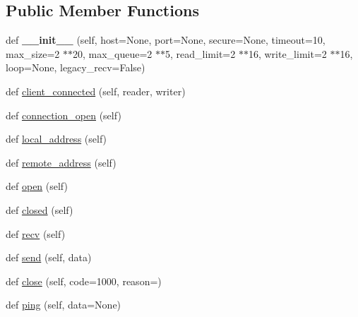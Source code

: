 \subsection*{Public Member Functions}
\begin{DoxyCompactItemize}
\item 
\mbox{\label{classwebsockets_1_1protocol_1_1_web_socket_common_protocol_a3974c237e95cb781821851d300c72ada}} 
def {\bfseries \+\_\+\+\_\+init\+\_\+\+\_\+} (self, host=None, port=None, secure=None, timeout=10, max\+\_\+size=2 $\ast$$\ast$20, max\+\_\+queue=2 $\ast$$\ast$5, read\+\_\+limit=2 $\ast$$\ast$16, write\+\_\+limit=2 $\ast$$\ast$16, loop=None, legacy\+\_\+recv=False)
\item 
def \hyperlink{classwebsockets_1_1protocol_1_1_web_socket_common_protocol_aefe4c82f5ec19977f55679023ac608fb}{client\+\_\+connected} (self, reader, writer)
\item 
def \hyperlink{classwebsockets_1_1protocol_1_1_web_socket_common_protocol_aae85117dc05aa48fa6de503bab27fef5}{connection\+\_\+open} (self)
\item 
def \hyperlink{classwebsockets_1_1protocol_1_1_web_socket_common_protocol_a147f81a594cc1d7f952a90800283ff2d}{local\+\_\+address} (self)
\item 
def \hyperlink{classwebsockets_1_1protocol_1_1_web_socket_common_protocol_a9eb8d78c5c3d633d9636ffd773de87ae}{remote\+\_\+address} (self)
\item 
def \hyperlink{classwebsockets_1_1protocol_1_1_web_socket_common_protocol_ac646626706d4fea1e2ac92c056d1b572}{open} (self)
\item 
def \hyperlink{classwebsockets_1_1protocol_1_1_web_socket_common_protocol_a52bc1f93413a8480ae83af00848d89f6}{closed} (self)
\item 
def \hyperlink{classwebsockets_1_1protocol_1_1_web_socket_common_protocol_a98319d5e461fef80290790f0bfbb51f2}{recv} (self)
\item 
def \hyperlink{classwebsockets_1_1protocol_1_1_web_socket_common_protocol_a18d893d014ed4d263ac98d1bf6034caf}{send} (self, data)
\item 
def \hyperlink{classwebsockets_1_1protocol_1_1_web_socket_common_protocol_a0ff205f28fde8948f321c8115696fea5}{close} (self, code=1000, reason=\textquotesingle{}\textquotesingle{})
\item 
def \hyperlink{classwebsockets_1_1protocol_1_1_web_socket_common_protocol_a660f3e46bbe578a1c624c544bf3e9e87}{ping} (self, data=None)

\end{DoxyCompactItemize}
